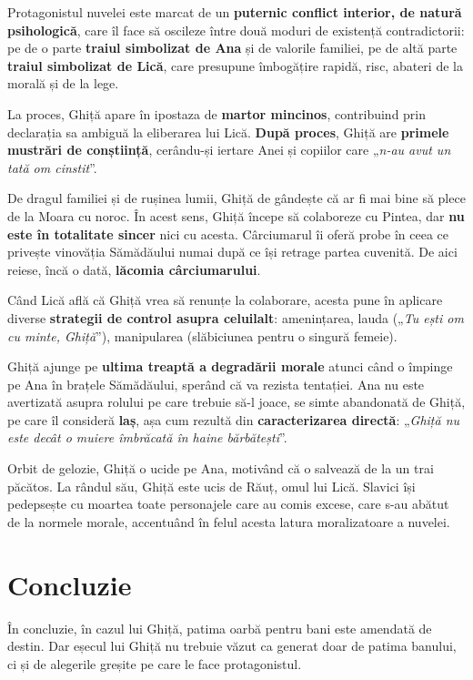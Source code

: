 \documentclass{article}
\newcommand{\qu}[1]{„\emph{#1}”}
\begin{document}
Protagonistul nuvelei este marcat de un \textbf{puternic conflict interior, de natură psihologică}, care îl face să oscileze între două moduri de existență contradictorii: pe de o parte \textbf{traiul simbolizat de Ana} și de valorile familiei, pe de altă parte \textbf{traiul simbolizat de Lică}, care presupune îmbogățire rapidă, risc, abateri de la morală și de la lege.

La proces, Ghiță apare în ipostaza de \textbf{martor mincinos}, contribuind prin declarația sa ambiguă la eliberarea lui Lică. \textbf{După proces}, Ghiță are \textbf{primele mustrări de conștiință}, cerându-și iertare Anei și copiilor care \qu{n-au avut un tată om cinstit}.

De dragul familiei și de rușinea lumii, Ghiță de gândește că ar fi mai bine să plece de la Moara cu noroc. În acest sens, Ghiță începe să colaboreze cu Pintea, dar \textbf{nu este în totalitate sincer} nici cu acesta. Cârciumarul îi oferă probe în ceea ce privește vinovăția Sămădăului numai după ce își retrage partea cuvenită. De aici reiese, încă o dată, \textbf{lăcomia cârciumarului}.

Când Lică află că Ghiță vrea să renunțe la colaborare, acesta pune în aplicare diverse \textbf{strategii de control asupra celuilalt}: amenințarea, lauda (\qu{Tu ești om cu minte, Ghiță}), manipularea (slăbiciunea pentru o singură femeie).

Ghiță ajunge pe \textbf{ultima treaptă a degradării morale} atunci când o împinge pe Ana în brațele Sămădăului, sperând că va rezista tentației. Ana nu este avertizată asupra rolului pe care trebuie să-l joace, se simte abandonată de Ghiță, pe care îl consideră \textbf{laș}, așa cum rezultă din \textbf{caracterizarea directă}: \qu{Ghiță nu este decât o muiere îmbrăcată în haine bărbătești}.

Orbit de gelozie, Ghiță o ucide pe Ana, motivând că o salvează de la un trai păcătos. La rândul său, Ghiță este ucis de Răuț, omul lui Lică. Slavici își pedepsește cu moartea toate personajele care au comis excese, care s-au abătut de la normele morale, accentuând în felul acesta latura moralizatoare a nuvelei.

\section{Concluzie}
În concluzie, în cazul lui Ghiță, patima oarbă pentru bani este amendată de destin. Dar eșecul lui Ghiță nu trebuie văzut ca generat doar de patima banului, ci și de alegerile greșite pe care le face protagonistul.
\end{document}
